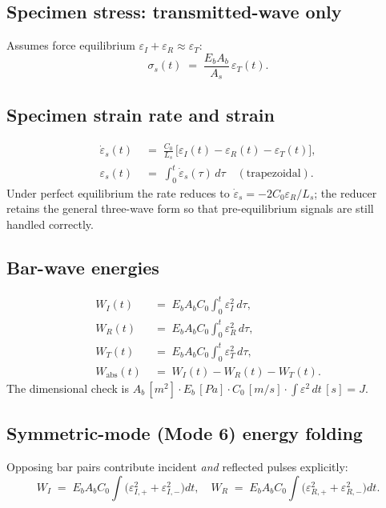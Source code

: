 \documentclass[11pt,a4paper,openany]{book}
\theoremstyle{handbook}
\newcommand{\sig}{\sigma}
\newcommand{\eps}{\varepsilon}
\newcommand{\epsdot}{\dot\eps}
\newcommand{\Cz}{C_0}
\newcommand{\Ab}{A_b}
\newcommand{\As}{A_s}
\newcommand{\Ls}{L_s}
\begin{document}
\subsection*{Specimen stress: transmitted-wave only}
Assumes force equilibrium $\eps_I+\eps_R\approx\eps_T$:
\begin{equation}
  \sig_s(t) \;=\; \frac{E_b\Ab}{\As}\,\eps_T(t).
  \label{eq:red-1wave}
\end{equation}

\subsection*{Specimen strain rate and strain}
\begin{align}
  \epsdot_s(t) &\;=\; \frac{\Cz}{\Ls}\,\bigl[\eps_I(t)-\eps_R(t)-\eps_T(t)\bigr],\\
  \eps_s(t) &\;=\; \int_{0}^{t}\!\epsdot_s(\tau)\,d\tau \quad (\text{trapezoidal}).
\end{align}
Under perfect equilibrium the rate reduces to $\epsdot_s=-2\Cz\eps_R/\Ls$;
the reducer retains the general three-wave form so that pre-equilibrium
signals are still handled correctly.

\subsection*{Bar-wave energies}
\begin{align}
  W_I(t) &\;=\; E_b\Ab\Cz\!\int_{0}^{t}\!\eps_I^{2}\,d\tau, \\
  W_R(t) &\;=\; E_b\Ab\Cz\!\int_{0}^{t}\!\eps_R^{2}\,d\tau, \\
  W_T(t) &\;=\; E_b\Ab\Cz\!\int_{0}^{t}\!\eps_T^{2}\,d\tau, \\
  W_{\text{abs}}(t) &\;=\; W_I(t) - W_R(t) - W_T(t).
\end{align}
The dimensional check is
$\Ab\,[\si{m^{2}}]\cdot E_b\,[\si{Pa}]\cdot \Cz\,[\si{m/s}]
\cdot\int\eps^{2}\,dt\,[\si{s}] = \si{J}$.

\subsection*{Symmetric-mode (Mode 6) energy folding}
Opposing bar pairs contribute incident \emph{and} reflected pulses
explicitly:
\begin{equation}
  W_I \;=\; E_b\Ab\Cz\!\int\bigl(\eps_{I,+}^{2}+\eps_{I,-}^{2}\bigr)dt,
  \quad
  W_R \;=\; E_b\Ab\Cz\!\int\bigl(\eps_{R,+}^{2}+\eps_{R,-}^{2}\bigr)dt.
\end{equation}
\end{document}
